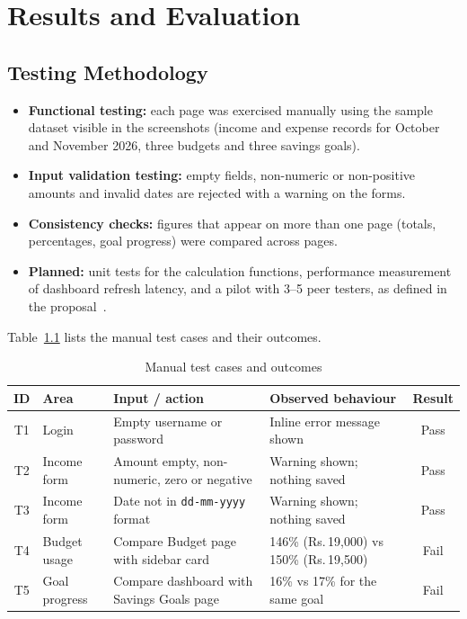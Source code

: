 \documentclass{tietreport}
\begin{document}

\chapter{Results and Evaluation}

\section{Testing Methodology}

\begin{itemize}
  \item \textbf{Functional testing:} each page was exercised
    manually using the sample dataset visible in the screenshots
    (income and expense records for October and November 2026,
    three budgets and three savings goals).
  \item \textbf{Input validation testing:} empty fields, non-numeric
    or non-positive amounts and invalid dates are rejected with a
    warning on the forms.
  \item \textbf{Consistency checks:} figures that appear on more
    than one page (totals, percentages, goal progress) were
    compared across pages.
  \item \textbf{Planned:} unit tests for the calculation functions,
    performance measurement of dashboard refresh latency, and a
    pilot with 3--5 peer testers, as defined in the
    proposal~\cite{pfmproposal}.
\end{itemize}

Table~\ref{tab:testcases} lists the manual test cases and their
outcomes.

\begin{table}[htbp]
\centering
\small
\begin{tabularx}{\textwidth}{|c|l|X|X|c|}
  \hline
  \textbf{ID} & \textbf{Area} & \textbf{Input / action} &
  \textbf{Observed behaviour} & \textbf{Result} \\
  \hline
  T1 & Login & Empty username or password &
    Inline error message shown & Pass \\
  \hline
  T2 & Income form & Amount empty, non-numeric, zero or negative &
    Warning shown; nothing saved & Pass \\
  \hline
  T3 & Income form & Date not in \texttt{dd-mm-yyyy} format &
    Warning shown; nothing saved & Pass \\
  \hline
  T4 & Budget usage & Compare Budget page with sidebar card &
    146\% (Rs.\,19,000) vs 150\% (Rs.\,19,500) & Fail \\
  \hline
  T5 & Goal progress & Compare dashboard with Savings Goals page &
    16\% vs 17\% for the same goal & Fail \\
  \hline
\end{tabularx}
\caption{Manual test cases and outcomes}
\label{tab:testcases}
\end{table}
\end{document}
